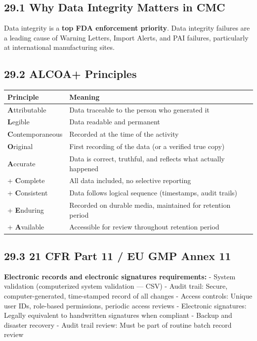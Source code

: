 \documentclass[
  11pt,
  a4paper,
]{report}
\begin{document}
\hypertarget{why-data-integrity-matters-in-cmc}{%
\subsection{29.1 Why Data Integrity Matters in
CMC}\label{why-data-integrity-matters-in-cmc}}

Data integrity is a \textbf{top FDA enforcement priority}. Data
integrity failures are a leading cause of Warning Letters, Import
Alerts, and PAI failures, particularly at international manufacturing
sites.

\hypertarget{alcoa-principles}{%
\subsection{29.2 ALCOA+ Principles}\label{alcoa-principles}}

\begin{longtable}[]{@{}ll@{}}
\toprule
Principle & Meaning\tabularnewline
\midrule
\endhead
\textbf{A}ttributable & Data traceable to the person who generated
it\tabularnewline
\textbf{L}egible & Data readable and permanent\tabularnewline
\textbf{C}ontemporaneous & Recorded at the time of the
activity\tabularnewline
\textbf{O}riginal & First recording of the data (or a verified true
copy)\tabularnewline
\textbf{A}ccurate & Data is correct, truthful, and reflects what
actually happened\tabularnewline
+ \textbf{C}omplete & All data included, no selective
reporting\tabularnewline
+ \textbf{C}onsistent & Data follows logical sequence (timestamps, audit
trails)\tabularnewline
+ \textbf{E}nduring & Recorded on durable media, maintained for
retention period\tabularnewline
+ \textbf{A}vailable & Accessible for review throughout retention
period\tabularnewline
\bottomrule
\end{longtable}

\hypertarget{cfr-part-11-eu-gmp-annex-11}{%
\subsection{29.3 21 CFR Part 11 / EU GMP Annex
11}\label{cfr-part-11-eu-gmp-annex-11}}

\textbf{Electronic records and electronic signatures requirements:} -
System validation (computerized system validation --- CSV) - Audit
trail: Secure, computer-generated, time-stamped record of all changes -
Access controls: Unique user IDs, role-based permissions, periodic
access reviews - Electronic signatures: Legally equivalent to
handwritten signatures when compliant - Backup and disaster recovery -
Audit trail review: Must be part of routine batch record review
\end{document}
